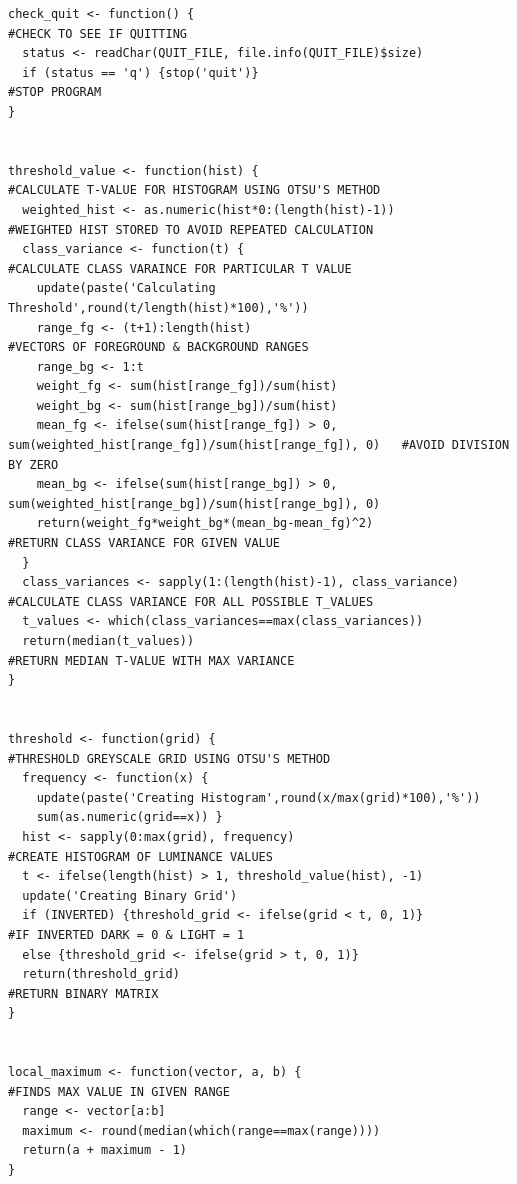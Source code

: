 \documentclass[titlepage]{article}
\begin{document}
\begin{changemargin}{-1in}{-1in}
\begin{verbatim}
check_quit <- function() {                                                      #CHECK TO SEE IF QUITTING
  status <- readChar(QUIT_FILE, file.info(QUIT_FILE)$size)
  if (status == 'q') {stop('quit')}                                             #STOP PROGRAM
}


threshold_value <- function(hist) {                                             #CALCULATE T-VALUE FOR HISTOGRAM USING OTSU'S METHOD
  weighted_hist <- as.numeric(hist*0:(length(hist)-1))                          #WEIGHTED HIST STORED TO AVOID REPEATED CALCULATION
  class_variance <- function(t) {                                               #CALCULATE CLASS VARAINCE FOR PARTICULAR T VALUE
    update(paste('Calculating Threshold',round(t/length(hist)*100),'%'))
    range_fg <- (t+1):length(hist)                                              #VECTORS OF FOREGROUND & BACKGROUND RANGES
    range_bg <- 1:t
    weight_fg <- sum(hist[range_fg])/sum(hist)
    weight_bg <- sum(hist[range_bg])/sum(hist)
    mean_fg <- ifelse(sum(hist[range_fg]) > 0, sum(weighted_hist[range_fg])/sum(hist[range_fg]), 0)   #AVOID DIVISION BY ZERO
    mean_bg <- ifelse(sum(hist[range_bg]) > 0, sum(weighted_hist[range_bg])/sum(hist[range_bg]), 0)
    return(weight_fg*weight_bg*(mean_bg-mean_fg)^2)                             #RETURN CLASS VARIANCE FOR GIVEN VALUE
  }
  class_variances <- sapply(1:(length(hist)-1), class_variance)                 #CALCULATE CLASS VARIANCE FOR ALL POSSIBLE T_VALUES
  t_values <- which(class_variances==max(class_variances))
  return(median(t_values))                                                      #RETURN MEDIAN T-VALUE WITH MAX VARIANCE
}


threshold <- function(grid) {                                                   #THRESHOLD GREYSCALE GRID USING OTSU'S METHOD
  frequency <- function(x) {
    update(paste('Creating Histogram',round(x/max(grid)*100),'%'))
    sum(as.numeric(grid==x)) }
  hist <- sapply(0:max(grid), frequency)                                        #CREATE HISTOGRAM OF LUMINANCE VALUES
  t <- ifelse(length(hist) > 1, threshold_value(hist), -1)
  update('Creating Binary Grid')
  if (INVERTED) {threshold_grid <- ifelse(grid < t, 0, 1)}                      #IF INVERTED DARK = 0 & LIGHT = 1
  else {threshold_grid <- ifelse(grid > t, 0, 1)}
  return(threshold_grid)                                                        #RETURN BINARY MATRIX
}


local_maximum <- function(vector, a, b) {                                       #FINDS MAX VALUE IN GIVEN RANGE
  range <- vector[a:b]
  maximum <- round(median(which(range==max(range))))
  return(a + maximum - 1)
}



\end{verbatim}
\end{changemargin}
\end{document}
